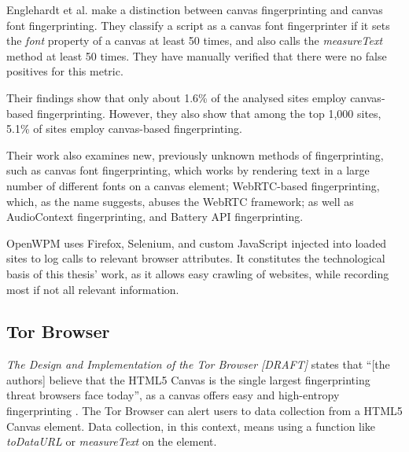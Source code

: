 \documentclass[
    fontsize=12pt,
    headings=small,
    parskip=half,
    bibliography=totoc,
    numbers=noenddot,
    open=any
    ]{scrreprt}
\begin{document}
Englehardt et al. make a distinction between canvas fingerprinting and canvas font fingerprinting.
They classify a script as a canvas font fingerprinter if it sets the \textit{font} property
of a canvas at least 50 times, and also calls the \textit{measureText} method at least 50 times.
They have manually verified that there were no false positives for this metric.

Their findings show that only about 1.6\% of the analysed sites
employ canvas-based fingerprinting. However, they also show that among the top 1,000 sites,
5.1\% of sites employ canvas-based fingerprinting.

Their work also examines new, previously unknown methods of fingerprinting, such as canvas font fingerprinting, which
works by rendering text in a large number of different fonts on a canvas element; WebRTC-based fingerprinting, which,
as the name suggests, abuses the WebRTC framework; as well as AudioContext fingerprinting, and Battery API fingerprinting.

OpenWPM uses Firefox, Selenium, and custom JavaScript injected into loaded sites to log calls to relevant browser attributes.
It constitutes the technological basis of this thesis' work, as it allows easy crawling of websites, while recording
most if not all relevant information.


\subsection{Tor Browser}
\label{related_work:tor_browser}
\textit{The Design and Implementation of the Tor Browser [DRAFT]}
states that ``[the authors] believe that the HTML5 Canvas is the single largest fingerprinting threat browsers face today'',
as a canvas offers easy and high-entropy fingerprinting
\cite{acar2014web,mowery2012pixel,torbrowser2018design}.
The Tor Browser can alert users to data collection from a HTML5 Canvas element.
Data collection, in this context, means using a function like \textit{toDataURL} or \textit{measureText} on the element.



\end{document}
